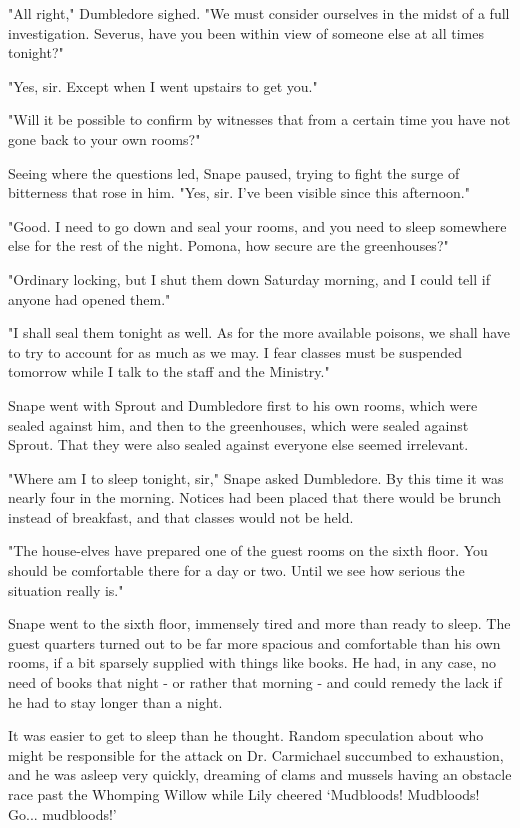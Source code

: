 "All right," Dumbledore sighed. "We must consider ourselves in the midst of a full investigation. Severus, have you been within view of someone else at all times tonight?"

"Yes, sir. Except when I went upstairs to get you."

"Will it be possible to confirm by witnesses that from a certain time you have not gone back to your own rooms?"

Seeing where the questions led, Snape paused, trying to fight the surge of bitterness that rose in him. "Yes, sir. I've been visible since this afternoon."

"Good. I need to go down and seal your rooms, and you need to sleep somewhere else for the rest of the night. Pomona, how secure are the greenhouses?"

"Ordinary locking, but I shut them down Saturday morning, and I could tell if anyone had opened them."

"I shall seal them tonight as well. As for the more available poisons, we shall have to try to account for as much as we may. I fear classes must be suspended tomorrow while I talk to the staff and the Ministry."

Snape went with Sprout and Dumbledore first to his own rooms, which were sealed against him, and then to the greenhouses, which were sealed against Sprout. That they were also sealed against everyone else seemed irrelevant.

"Where am I to sleep tonight, sir," Snape asked Dumbledore. By this time it was nearly four in the morning. Notices had been placed that there would be brunch instead of breakfast, and that classes would not be held.

"The house-elves have prepared one of the guest rooms on the sixth floor. You should be comfortable there for a day or two. Until we see how serious the situation really is."

Snape went to the sixth floor, immensely tired and more than ready to sleep. The guest quarters turned out to be far more spacious and comfortable than his own rooms, if a bit sparsely supplied with things like books. He had, in any case, no need of books that night - or rather that morning - and could remedy the lack if he had to stay longer than a night.

It was easier to get to sleep than he thought. Random speculation about who might be responsible for the attack on Dr. Carmichael succumbed to exhaustion, and he was asleep very quickly, dreaming of clams and mussels having an obstacle race past the Whomping Willow while Lily cheered `Mudbloods! Mudbloods! Go... mudbloods!'

